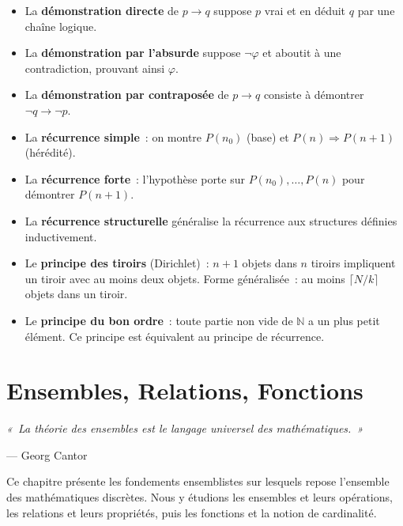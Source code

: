 \documentclass[12pt,a4paper,openany]{book}
\theoremstyle{definition}
\theoremstyle{plain}
\theoremstyle{remark}
\newcommand{\N}{\mathbb{N}}
\begin{document}
\begin{itemize}[leftmargin=2em]
  \item La \textbf{d\'emonstration directe} de $p \to q$ suppose $p$ vrai et en d\'eduit $q$ par une cha\^ine logique.
  \item La \textbf{d\'emonstration par l'absurde} suppose $\neg\varphi$ et aboutit \`a une contradiction, prouvant ainsi $\varphi$.
  \item La \textbf{d\'emonstration par contrapos\'ee} de $p \to q$ consiste \`a d\'emontrer $\neg q \to \neg p$.
  \item La \textbf{r\'ecurrence simple}~: on montre $P(n_0)$ (base) et $P(n) \Rightarrow P(n+1)$ (h\'er\'edit\'e).
  \item La \textbf{r\'ecurrence forte}~: l'hypoth\`ese porte sur $P(n_0), \dots, P(n)$ pour d\'emontrer $P(n+1)$.
  \item La \textbf{r\'ecurrence structurelle} g\'en\'eralise la r\'ecurrence aux structures d\'efinies inductivement.
  \item Le \textbf{principe des tiroirs} (Dirichlet)~: $n+1$ objets dans $n$ tiroirs impliquent un tiroir avec au moins deux objets. Forme g\'en\'eralis\'ee~: au moins $\lceil N/k \rceil$ objets dans un tiroir.
  \item Le \textbf{principe du bon ordre}~: toute partie non vide de $\N$ a un plus petit \'el\'ement. Ce principe est \'equivalent au principe de r\'ecurrence.
\end{itemize}


\chapter{Ensembles, Relations, Fonctions}\label{ch:ensembles-relations-fonctions}

\begin{center}
\textit{«~La théorie des ensembles est le langage universel des mathématiques.~»}

--- Georg Cantor
\end{center}

\bigskip

Ce chapitre présente les fondements ensemblistes sur lesquels repose
l'ensemble des mathématiques discrètes. Nous y étudions les ensembles et
leurs opérations, les relations et leurs propriétés, puis les fonctions et la
notion de cardinalité.
\end{document}
